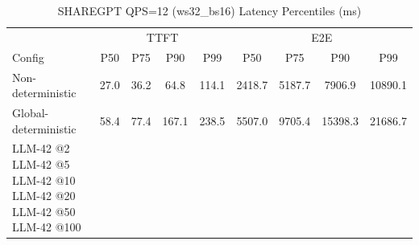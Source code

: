\begin{table}[htbp]
\centering
\caption{SHAREGPT QPS=12 (ws32_bs16) Latency Percentiles (ms)}
\label{tab:sharegpt_qps12_ws32_bs16}
\begin{tabular}{l|cccc|cccc}
\toprule
& \multicolumn{4}{c|}{TTFT} & \multicolumn{4}{c}{E2E} \\
Config & P50 & P75 & P90 & P99 & P50 & P75 & P90 & P99 \\
\midrule
Non-deterministic & 27.0 & 36.2 & 64.8 & 114.1 & 2418.7 & 5187.7 & 7906.9 & 10890.1 \\
Global-deterministic & 58.4 & 77.4 & 167.1 & 238.5 & 5507.0 & 9705.4 & 15398.3 & 21686.7 \\
LLM-42 @2%
LLM-42 @5%
LLM-42 @10%
LLM-42 @20%
LLM-42 @50%
LLM-42 @100%
\bottomrule
\end{tabular}
\end{table}
